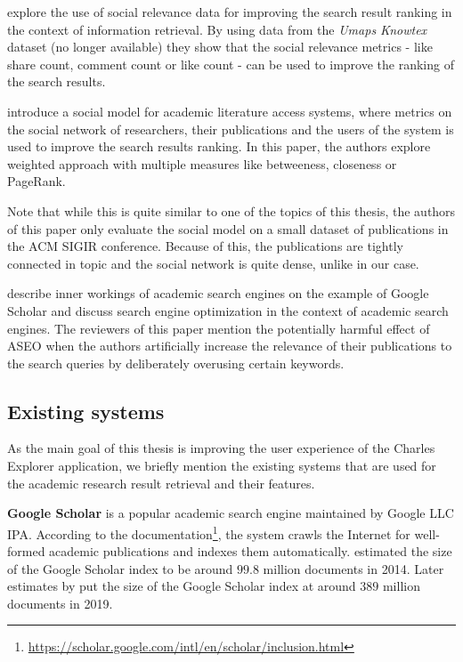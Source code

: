 \cite{social-relevance-for-re-ranking-documents} explore the use of social relevance data for improving the search result ranking in the context of information retrieval.
By using data from the \textit{Umaps Knowtex} dataset (no longer available) they show that the social relevance metrics - like share count, comment count or like count - can be used to improve the ranking of the search results.

\cite{social-model-literature-access} introduce a social model for academic literature access systems, 
where metrics on the social network of researchers, their publications and the users of the system is used to improve 
the search results ranking. In this paper, the authors explore weighted approach with multiple measures like betweeness, closeness or PageRank.

Note that while this is quite similar to one of the topics of this thesis, the authors of this paper
only evaluate the social model on a small dataset of publications in the \ac{ACM} \ac{SIGIR} conference.
Because of this, the publications are tightly connected in topic and the social network is quite dense, unlike in our case.

\cite{aseo} describe inner workings of academic search engines on the example of Google Scholar and
discuss search engine optimization in the context of academic search engines. 
The reviewers of this paper mention the potentially harmful effect of \ac{ASEO} when the authors artificially increase 
the relevance of their publications to the search queries by deliberately overusing certain keywords.

\subsection*{Existing systems}

As the main goal of this thesis is improving the user experience of the Charles Explorer application,
we briefly mention the existing systems that are used for the academic research result retrieval and their features.

\textbf{Google Scholar} is a popular academic search engine maintained by Google LLC IPA.
According to the documentation\footnote{\url{https://scholar.google.com/intl/en/scholar/inclusion.html}}, the system crawls the Internet for well-formed academic publications and indexes them automatically. 
\cite{google-scholar-size-estimation-2014} estimated the size of the Google Scholar index to be around $99.8$ million documents in 2014.
Later estimates by \cite{google-scholar-size} put the size of the Google Scholar index at around $389$ million documents in 2019.


